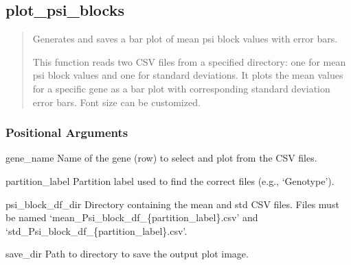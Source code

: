 \documentclass[letterpaper,10pt,english]{sphinxmanual}
\begin{document}
\subsection{plot\_psi\_blocks}
\label{\detokenize{cli:plot_psi_blocks}}\begin{quote}

\sphinxAtStartPar
Generates and saves a bar plot of mean psi block values with error bars.

\sphinxAtStartPar
This function reads two CSV files from a specified directory: one for mean
psi block values and one for standard deviations. It plots the mean values
for a specific gene as a bar plot with corresponding standard deviation
error bars. Font size can be customized.
\end{quote}

\begin{sphinxVerbatim}[commandchars=\\\{\}]
  \PYG{p}{[}\PYG{p}{]} \PYG{p}{[} \PYG{p}{]}    
\end{sphinxVerbatim}


\subsubsection{Positional Arguments}
\label{\detokenize{cli:positional-arguments_repeat5}}\begin{optionlist}{3cm}
\item [gene\_name]  
\sphinxAtStartPar
Name of the gene (row) to select and plot from the CSV files.
\item [partition\_label]  
\sphinxAtStartPar
Partition label used to find the correct files (e.g., ‘Genotype’).
\item [psi\_block\_df\_dir]  
\sphinxAtStartPar
Directory containing the mean and std CSV files. Files must be named ‘mean\_Psi\_block\_df\_\{partition\_label\}.csv’ and ‘std\_Psi\_block\_df\_\{partition\_label\}.csv’.
\item [save\_dir]  
\sphinxAtStartPar
Path to directory to save the output plot image.
\end{optionlist}
\end{document}
